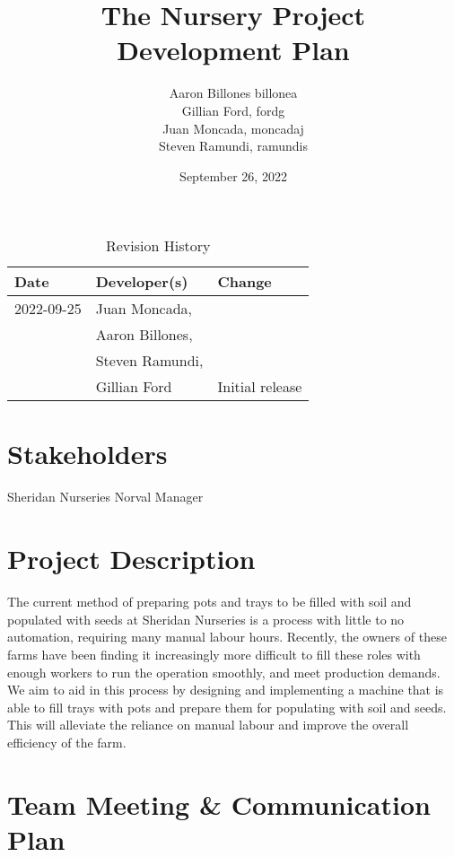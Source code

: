 \documentclass{article}
\title{The Nursery Project\\ Development Plan}
\author{Aaron Billones billonea\\Gillian Ford, fordg\\Juan Moncada, moncadaj\\Steven Ramundi, ramundis}
\date{September 26, 2022}
\begin{document}
\maketitle

\begin{table}[hp]
	\caption{Revision History} \label{TblRevisionHistory}
	\begin{tabularx}{\textwidth}{llX}
	\toprule
	\textbf{Date} & \textbf{Developer(s)} & \textbf{Change}\\
	\midrule
	2022-09-25 & Juan Moncada,\\&Aaron Billones,\\&Steven Ramundi,\\&Gillian Ford & Initial release\\
	\bottomrule
	\end{tabularx}
	\end{table}

	\newpage
	
	\section{Stakeholders}
	Sheridan Nurseries Norval Manager
	
	\section{Project Description} 
	The current method of preparing pots and trays to be filled with soil and populated with seeds at Sheridan Nurseries is a process with little to no automation, requiring many manual labour hours. Recently, the owners of these farms have been finding it increasingly more difficult to fill these roles with enough workers to run the operation smoothly, and meet production demands. We aim to aid in this process by designing and implementing a machine that is able to fill trays with pots and prepare them for populating with soil and seeds. This will alleviate the reliance on manual labour and improve the overall efficiency of the farm.

	\section{Team Meeting \& Communication Plan}
	
\end{document}
